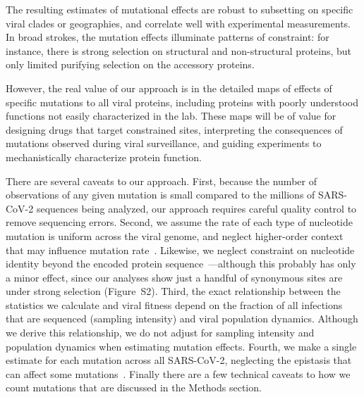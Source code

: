 \documentclass[9pt,twocolumn,twoside]{gsajnl_modified}
\begin{document}
The resulting estimates of mutational effects are robust to subsetting on specific viral clades or geographies, and correlate well with experimental measurements.
In broad strokes, the mutation effects illuminate patterns of constraint: for instance, there is strong selection on structural and non-structural proteins, but only limited purifying selection on the accessory proteins.

However, the real value of our approach is in the detailed maps of effects of specific mutations to all viral proteins, including proteins with poorly understood functions not easily characterized in the lab.
These maps will be of value for designing drugs that target constrained sites, interpreting the consequences of mutations observed during viral surveillance, and guiding experiments to mechanistically characterize protein function.

There are several caveats to our approach.
First, because the number of observations of any given mutation is small compared to the millions of SARS-CoV-2 sequences being analyzed, our approach requires careful quality control to remove sequencing errors.
Second, we assume the rate of each type of nucleotide mutation is uniform across the viral genome, and neglect higher-order context that may influence mutation rate~\citep{sadykov2021short,beale2004comparison}.
Likewise, we neglect constraint on nucleotide identity beyond the encoded protein sequence~\citep{huston2021comprehensive,kuo2013functional}---although this probably has only a minor effect, since our analyses show just a handful of synonymous sites are under strong selection (Figure~S2).
Third, the exact relationship between the statistics we calculate and viral fitness depend on the fraction of all infections that are sequenced (sampling intensity) and viral population dynamics.
Although we derive this relationship, we do not adjust for sampling intensity and population dynamics when estimating mutation effects.
Fourth, we make a single estimate for each mutation across all SARS-CoV-2, neglecting the epistasis that can affect some mutations~\citep{starr2022shifting,moulana2022compensatory}.
Finally there are a few technical caveats to how we count mutations that are discussed in the Methods section.
\end{document}
